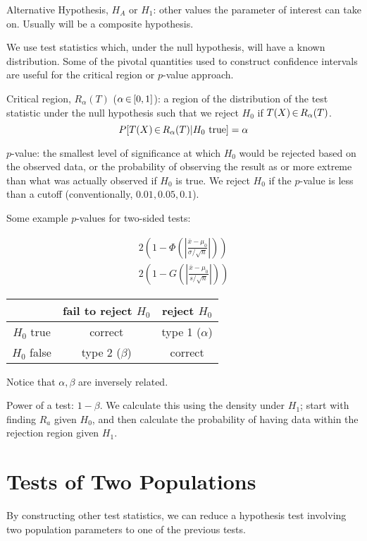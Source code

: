 \documentclass[letterpaper, 8pt]{extarticle}
\begin{document}
\begin{multicols*}{3}
	Alternative Hypothesis, $H_A$ or $H_1$: other values the parameter of interest can take on. Usually will be a composite hypothesis.

	We use test statistics which, under the null hypothesis, will have a known distribution. Some of the pivotal quantities used to construct confidence intervals are useful for the critical region or $p$-value approach.

	Critical region, $R_\alpha(T)$ ($\alpha\,{\in}\,[0,1]$): a region of the distribution of the test statistic under the null hypothesis such that we reject $H_0$ if $T(X)\,{\in}\, R_\alpha(T)$.
	\[P[T(X)\,{\in}\, R_\alpha(T)|H_0\text{ true}]=\alpha\]

	$p$-value: the smallest level of significance at which $H_0$ would be rejected based on the observed data, or the probability of observing the result as or more extreme than what was actually observed if $H_0$ is true. We reject $H_0$ if the $p$-value is less than a cutoff (conventionally, $0.01,0.05,0.1$).

	Some example $p$-values for two-sided tests:

	\begin{gather*}
		2\left(1-\Phi\left(\left|\frac{\bar x-\mu_0}{\sigma/\sqrt n}\right|\right)\right) \tag{z test} \\
		2\left(1-G\left(\left|\frac{\bar x-\mu_0}{s/\sqrt n}\right|\right)\right) \tag{t test}
	\end{gather*}

	\begin{center}
		\begin{tabular}{c|c|c}
			\hline
			& fail to reject $H_0$ & reject $H_0$ \\\hline
			$H_0$ true & correct & type 1 ($\alpha$) \\\hline
			$H_0$ false & type 2 ($\beta$) & correct \\\hline
		\end{tabular}
	\end{center}
	Notice that $\alpha,\beta$ are inversely related. 

	Power of a test: $1-\beta$. We calculate this using the density under $H_1$; start with finding $R_a$ given $H_0$, and then calculate the probability of having data within the rejection region given $H_1$.

	\section{Tests of Two Populations}
	By constructing other test statistics, we can reduce a hypothesis test involving two population parameters to one of the previous tests.


\end{multicols*}
\end{document}
